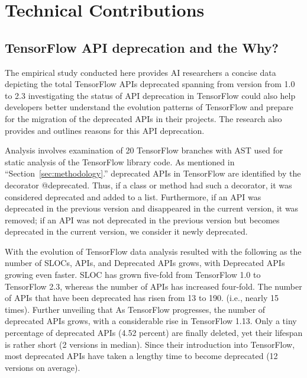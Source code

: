 \documentclass[12pt,letterpaper]{report}
\begin{document}
\chapter{Technical Contributions}

\section{TensorFlow API deprecation and the Why?} \label{sec:deprecationwhy}
The empirical study conducted here provides AI researchers a concise data depicting the total TensorFlow APIs deprecated spanning from version from 1.0 to 2.3 investigating the status of API deprecation in TensorFlow could also help developers better understand the evolution patterns of TensorFlow and prepare for the migration of the deprecated APIs in their projects. The research also provides and outlines reasons for this API deprecation.

Analysis involves examination of 20 TensorFlow branches with AST used for static analysis of the TensorFlow library code. As mentioned in ``Section~\ref{sec:methodology}.'' deprecated APIs in TensorFlow are identified by the decorator @deprecated. Thus, if a class or method had such a decorator, it was considered deprecated and added to a list. Furthermore, if an API was deprecated in the previous version and disappeared in the current version, it was removed; if an API was not deprecated in the previous version but becomes deprecated in the current version, we consider it newly deprecated.

With the evolution of TensorFlow data analysis resulted with the following as the number of SLOCs, APIs, and Deprecated APIs grows, with Deprecated APIs growing even faster. SLOC has grown five-fold from TensorFlow 1.0 to TensorFlow 2.3, whereas the number of APIs has increased four-fold. The number of APIs that have been deprecated has risen from 13 to 190. (i.e., nearly 15 times). Further unveiling that As TensorFlow progresses, the number of deprecated APIs grows, with a considerable rise in TensorFlow 1.13. Only a tiny percentage of deprecated APIs (4.52 percent) are finally deleted, yet their lifespan is rather short (2 versions in median). Since their introduction into TensorFlow, most deprecated APIs have taken a lengthy time to become deprecated (12 versions on average).
\end{document}
